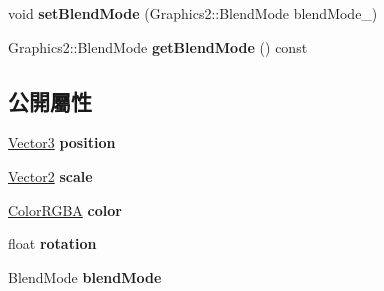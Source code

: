 \begin{DoxyCompactItemize}
\item 
void {\bfseries set\+Blend\+Mode} (Graphics2\+::\+Blend\+Mode blend\+Mode\+\_\+)\hypertarget{class_magnum_1_1_graphics2_a99d881e73fe1ceb309e0db152e884cb6}{}\label{class_magnum_1_1_graphics2_a99d881e73fe1ceb309e0db152e884cb6}

\item 
Graphics2\+::\+Blend\+Mode {\bfseries get\+Blend\+Mode} () const \hypertarget{class_magnum_1_1_graphics2_ae18b7ea97894b285c105455cc5e74a65}{}\label{class_magnum_1_1_graphics2_ae18b7ea97894b285c105455cc5e74a65}

\end{DoxyCompactItemize}
\subsection*{公開屬性}
\begin{DoxyCompactItemize}
\item 
\hyperlink{class_i_dream_sky_1_1_vector3}{Vector3} {\bfseries position}\hypertarget{class_magnum_1_1_graphics2_a49e91c92d3f30b2b800eca077738a5c3}{}\label{class_magnum_1_1_graphics2_a49e91c92d3f30b2b800eca077738a5c3}

\item 
\hyperlink{class_i_dream_sky_1_1_vector2}{Vector2} {\bfseries scale}\hypertarget{class_magnum_1_1_graphics2_ab062e51a9721de62e47c4f8a8c892be4}{}\label{class_magnum_1_1_graphics2_ab062e51a9721de62e47c4f8a8c892be4}

\item 
\hyperlink{class_i_dream_sky_1_1_color_r_g_b_a}{Color\+R\+G\+BA} {\bfseries color}\hypertarget{class_magnum_1_1_graphics2_af25438b02f6ac93fac274ec8c5e4493f}{}\label{class_magnum_1_1_graphics2_af25438b02f6ac93fac274ec8c5e4493f}

\item 
float {\bfseries rotation}\hypertarget{class_magnum_1_1_graphics2_a815d13330aa4caf9c6fe06d9b896b71a}{}\label{class_magnum_1_1_graphics2_a815d13330aa4caf9c6fe06d9b896b71a}

\item 
Blend\+Mode {\bfseries blend\+Mode}\hypertarget{class_magnum_1_1_graphics2_a543ceaafc065391cf8a404b01561b4e8}{}\label{class_magnum_1_1_graphics2_a543ceaafc065391cf8a404b01561b4e8}

\end{DoxyCompactItemize}
